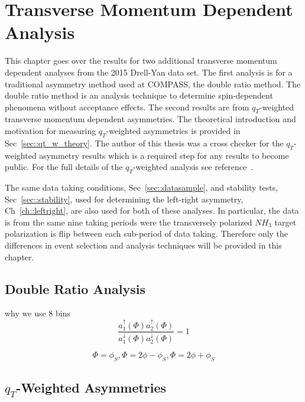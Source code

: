 \chapter{Transverse Momentum Dependent Analysis} \label{ch::tmdanalysis}
\ifpdf
\graphicspath{{Chapters/TMDAnalysis/Figs/}}
\fi

This chapter goes over the results for two additional transverse momentum
dependent analyses from the 2015 Drell-Yan data set.  The first analysis is for
a traditional asymmetry method used at COMPASS, the double ratio method.  The
double ratio method is an analysis technique to determine spin-dependent
phenomena without acceptance effects.  The second results are from
$q_T$-weighted transverse momentum dependent asymmetries. The theoretical
introduction and motivation for measuring $q_T$-weighted asymmetries is provided
in Sec~\ref{sec::qt_w_theory}.  The author of this thesis was a cross checker
for the $q_T$-weighted asymmetry results which is a required step for any
results to become public.  For the full details of the $q_T$-weighted analysis
see reference~\cite{janthesis}.

The same data taking conditions, Sec~\ref{sec::datasample}, and stability tests,
Sec~\ref{sec::stability}, used for determining the left-right asymmetry,
Ch~\ref{ch::leftright}, are also used for both of these analyses.  In
particular, the data is from the same nine taking periods were the transversely
polarized $NH_3$ target polarization is flip between each sub-period of data
taking.  Therefore only the differences in event selection and analysis
techniques will be provided in this chapter.

\section{Double Ratio Analysis} \label{sec::doubleratio}
why we use 8 bins
\begin{equation}
  \label{equ::a_resonable_assump}
  \frac{a_1^\uparrow(\Phi) a_2^\uparrow(\Phi)}
       {a_1^\downarrow(\Phi) a_2^\downarrow(\Phi)}
       = 1
\end{equation}

\begin{equation}
  \label{equ::ratio_phiAngles}
  \Phi = \phi_S, \Phi = 2\phi - \phi_S, \Phi = 2\phi + \phi_S
\end{equation}

\section{$q_T$-Weighted Asymmetries}

